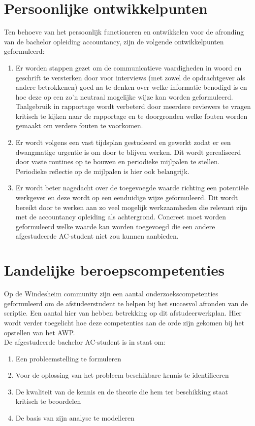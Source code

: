 \documentclass[10pt,a4paper,oneside]{report}
\begin{document}
    \section{Persoonlijke ontwikkelpunten}
Ten behoeve van het persoonlijk functioneren en ontwikkelen voor de afronding van de bachelor opleiding accountancy, zijn de volgende ontwikkelpunten geformuleerd:
\begin{enumerate}
    \item Er worden stappen gezet om de communicatieve vaardigheden in woord en geschrift te versterken door voor interviews (met zowel de opdrachtgever als andere betrokkenen) goed na te denken over welke informatie benodigd is en hoe deze op een zo'n neutraal mogelijke wijze kan worden geformuleerd. Taalgebruik in rapportage wordt verbeterd door meerdere reviewers te vragen kritisch te kijken naar de rapportage en te doorgronden welke fouten worden gemaakt om verdere fouten te voorkomen. 
    \item Er wordt volgens een vast tijdsplan gestudeerd en gewerkt zodat er een dwangmatige urgentie is om door te blijven werken. Dit wordt gerealiseerd door vaste routines op te bouwen en periodieke mijlpalen te stellen. Periodieke reflectie op de mijlpalen is hier ook belangrijk.
    \item Er wordt beter nagedacht over de toegevoegde waarde richting een potentiële werkgever en deze wordt op een eenduidige wijze geformuleerd. Dit wordt bereikt door te werken aan zo veel mogelijk werkzaamheden die relevant zijn met de accountancy opleiding als achtergrond. Concreet moet worden geformuleerd welke waarde kan worden toegevoegd die een andere afgestudeerde AC-student niet zou kunnen aanbieden.
\end{enumerate}

\newpage
    \section{Landelijke beroepscompetenties}
Op de Windesheim community zijn een aantal onderzoekscompetenties geformuleerd om de afstudeerstudent te helpen bij het succesvol afronden van de scriptie. Een aantal hier van hebben betrekking op dit afstudeerwerkplan. Hier wordt verder toegelicht hoe deze competenties aan de orde zijn gekomen bij het opstellen van het AWP. \\
De afgestudeerde bachelor AC-student is in staat om: 
\begin{enumerate}
    \item Een probleemstelling te formuleren
    \item Voor de oplossing van het probleem beschikbare kennis te identificeren
    \item De kwaliteit van de kennis en de theorie die hem ter beschikking staat kritisch te beoordelen
    \item De basis van zijn analyse te modelleren
\end{enumerate}
\end{document}
